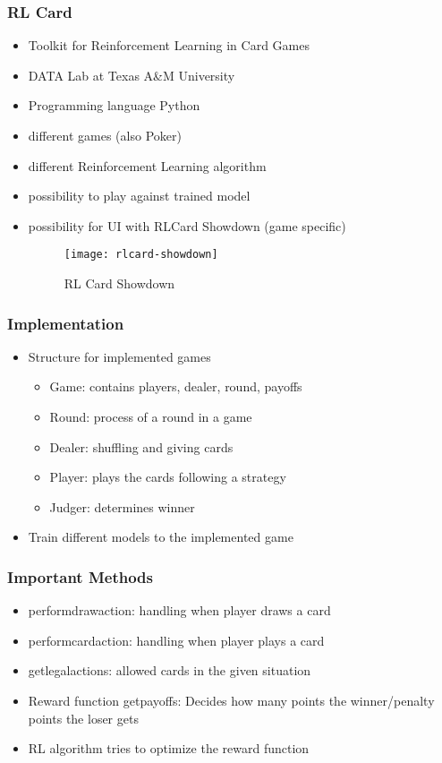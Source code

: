 \begin{frame}
    \frametitle{RL Card}
    \begin{itemize}
        \item Toolkit for Reinforcement Learning in Card Games
        \item DATA Lab at Texas A\&M University
        \item Programming language Python
        \item different games (also Poker)
        \item different Reinforcement Learning algorithm
        \item possibility to play against trained model
        \item possibility for UI with RLCard Showdown (game specific)
        \begin{figure}
                  \texttt{[image: rlcard-showdown]}
                  \caption{RL Card Showdown}
        \end{figure}
    \end{itemize}
\end{frame}


\begin{frame}
    \frametitle{Implementation}
    \begin{itemize}
        \item Structure for implemented games
        \begin{itemize}
            \item Game: contains players, dealer, round, payoffs
            \item Round: process of a round in a game
            \item Dealer: shuffling and giving cards
            \item Player: plays the cards following a strategy
            \item Judger: determines winner
        \end{itemize}
        \item Train different models to the implemented game
    \end{itemize}
\end{frame}


\begin{frame}
    \frametitle{Important Methods}
    \begin{itemize}
        \item perform\textunderscore draw\textunderscore action: handling when player draws a card
        \item perform\textunderscore card\textunderscore action: handling when player plays a card
        \item get\textunderscore legal\textunderscore actions: allowed cards in the given situation
        \item Reward function get\textunderscore payoffs: Decides how many points the winner/penalty points the loser gets
        \item RL algorithm tries to optimize the reward function
    \end{itemize}
\end{frame}

